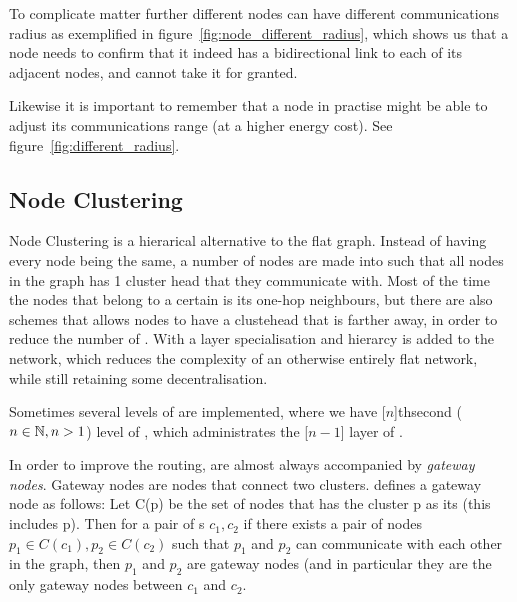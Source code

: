 \documentclass[letter, 12pt, english, draft]{article}
\begin{document}

To complicate matter further different nodes can have different communications radius as exemplified in figure~\ref{fig:node_different_radius}, which shows us that a node needs to confirm that it indeed has a bidirectional link to each of its adjacent nodes, and cannot take it for granted.


Likewise it is important to remember that a node in practise might be able to adjust its communications range (at a higher energy cost). See figure~\ref{fig:different_radius}.

\subsection{Node Clustering}
\label{cluster methods}
Node Clustering is a hierarical alternative to the flat graph. Instead of having every node being the same, a number of nodes are made into \ch such that all nodes in the graph has 1 cluster head that they communicate with. Most of the time the nodes that belong to a certain \ch is its one-hop neighbours, but there are also schemes that allows nodes to have a clustehead that is farther away, in order to reduce the number of \ch. With \ch a layer specialisation and hierarcy is added to the network, which reduces the complexity of an otherwise entirely flat network, while still retaining some decentralisation.
  
Sometimes several levels of \ch are implemented, where we have [$n$]thsecond ($n \in \mathbb{N}, n > 1$) level of \ch, which administrates the [$n-1$] layer of \ch.  

In order to improve the routing, \ch are almost always accompanied by \emph{gateway nodes}. Gateway nodes are nodes that connect two clusters. \cite{spanners} defines a gateway node as follows:
Let C(p) be the set of nodes that has the cluster p as its \ch (this includes p). Then for a pair of \ch s $c_1, c_2$ if there exists a pair of nodes $p_1 \in C(c_1), p_2 \in C(c_2)$ such that $p_1$ and $p_2$ can communicate with each other in the graph, then $p_1$ and $p_2$ are gateway nodes (and in particular they are the only gateway nodes between $c_1$ and $c_2$.  
\end{document}
